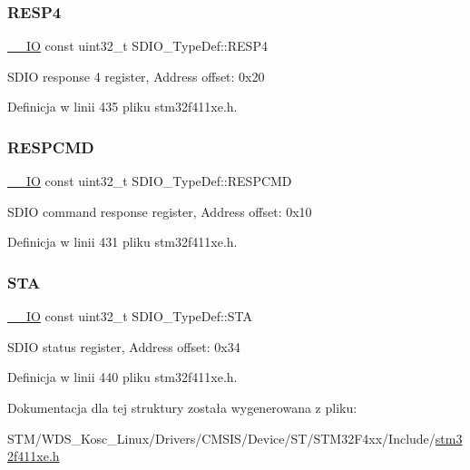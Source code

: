 \subsubsection{\texorpdfstring{R\+E\+S\+P4}{RESP4}}
{\footnotesize\ttfamily \hyperlink{core__sc300_8h_aec43007d9998a0a0e01faede4133d6be}{\+\_\+\+\_\+\+IO} const uint32\+\_\+t S\+D\+I\+O\+\_\+\+Type\+Def\+::\+R\+E\+S\+P4}

S\+D\+IO response 4 register, Address offset\+: 0x20 

Definicja w linii 435 pliku stm32f411xe.\+h.

\mbox{\label{struct_s_d_i_o___type_def_ad0076eec3f30c0279c193da7173af543}} 
\subsubsection{\texorpdfstring{R\+E\+S\+P\+C\+MD}{RESPCMD}}
{\footnotesize\ttfamily \hyperlink{core__sc300_8h_aec43007d9998a0a0e01faede4133d6be}{\+\_\+\+\_\+\+IO} const uint32\+\_\+t S\+D\+I\+O\+\_\+\+Type\+Def\+::\+R\+E\+S\+P\+C\+MD}

S\+D\+IO command response register, Address offset\+: 0x10 

Definicja w linii 431 pliku stm32f411xe.\+h.

\mbox{\label{struct_s_d_i_o___type_def_a48171dbf6fb65eba02b912209ef29cce}} 
\subsubsection{\texorpdfstring{S\+TA}{STA}}
{\footnotesize\ttfamily \hyperlink{core__sc300_8h_aec43007d9998a0a0e01faede4133d6be}{\+\_\+\+\_\+\+IO} const uint32\+\_\+t S\+D\+I\+O\+\_\+\+Type\+Def\+::\+S\+TA}

S\+D\+IO status register, Address offset\+: 0x34 

Definicja w linii 440 pliku stm32f411xe.\+h.



Dokumentacja dla tej struktury została wygenerowana z pliku\+:\begin{DoxyCompactItemize}
\item 
S\+T\+M/\+W\+D\+S\+\_\+\+Kosc\+\_\+\+Linux/\+Drivers/\+C\+M\+S\+I\+S/\+Device/\+S\+T/\+S\+T\+M32\+F4xx/\+Include/\hyperlink{stm32f411xe_8h}{stm32f411xe.\+h}\end{DoxyCompactItemize}
